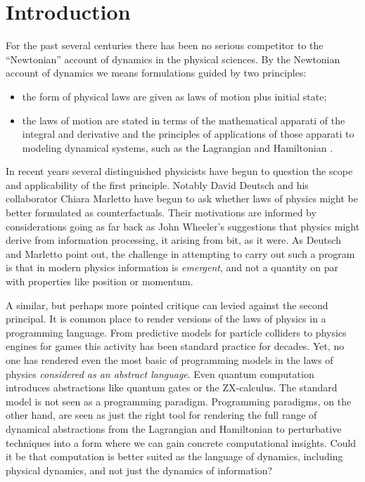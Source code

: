 \section{Introduction}\label{sec:introduction} %
For the past several centuries there has been no serious competitor to
the ``Newtonian'' account of dynamics in the physical sciences. By the
Newtonian account of dynamics we means formulations guided by two principles:
\begin{itemize}
  \item the form of physical laws are given as laws of motion plus initial state;
  \item the laws of motion are stated in terms of the mathematical
    apparati of the integral and derivative and the principles of
    applications of those apparati to modeling dynamical systems, such
    as the Lagrangian and Hamiltonian \cite{375178}.
\end{itemize}
In recent years several distinguished physicists have begun to
question the scope and applicability of the first principle. Notably
David Deutsch and his collaborator Chiara Marletto have begun to ask
whether laws of physics might be better formulated as
counterfactuals. Their motivations are informed by considerations
going as far back as John Wheeler's suggestions that physics might
derive from information processing, it arising from bit, as it
were. As Deutsch and Marletto point out, the challenge in attempting
to carry out such a program is that in modern physics information is
\emph{emergent}, and not a quantity on par with properties like
position or momentum.

A similar, but perhaps more pointed critique can levied against the
second principal. It is common place to render versions of the laws of
physics in a programming language. From predictive models for particle
colliders to physics engines for games this activity has been standard
practice for decades. Yet, no one has rendered even the most basic of
programming models in the laws of physics \emph{considered as an
  abstract language}. Even quantum computation introduces abstractions
like quantum gates or the ZX-calculus. The standard model is not seen
as a programming paradigm. Programming paradigms, on the other hand,
are seen as just the right tool for rendering the full range of
dynamical abstractions from the Lagrangian and Hamiltonian to
perturbative techniques into a form where we can gain concrete
computational insights. Could it be that computation is better suited
as the language of dynamics, including physical dynamics, and not just
the dynamics of information?

